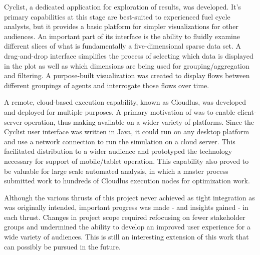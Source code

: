 Cyclist, a dedicated application for exploration of \Cyclus results, was
developed.  It's primary capabilities at this stage are best-suited to
experienced fuel cycle analysts, but it provides a basic platform for simpler
visualizations for other audiences.  An important part of its interface is the
ability to fluidly examine different slices of what is fundamentally a
five-dimensional sparse data set.  A drag-and-drop interface simplifies the
process of selecting which data is displayed in the plot as well as which
dimensions are being used for grouping/aggregation and filtering.  A
purpose-built visualization was created to display flows between different
groupings of agents and interrogate those flows over time.

A remote, cloud-based execution capability, known as Cloudlus, was developed
and deployed for multiple purposes.  A primary motivation of was to enable
client-server operation, thus making \Cyclus available on a wider variety of
platforms.  Since the Cyclist user interface was written in Java, it could run
on any desktop platform and use a network connection to run the simulation on
a cloud server.  This facilitated distribution to a wider audience and
prototyped the technology necessary for support of mobile/tablet operation.
This capability also proved to be valuable for large scale automated analysis,
in which a master process submitted work to hundreds of Cloudlus execution
nodes for optimization work.

Although the various thrusts of this project never achieved as tight
integration as was originally intended, important progress was made - and
insights gained - in each thrust.  Changes in project scope required
refocusing on fewer stakeholder groups and undermined the ability to develop
an improved user experience for a wide variety of audiences.  This is still
an interesting extension of this work that can possibly be pursued in the
future.

